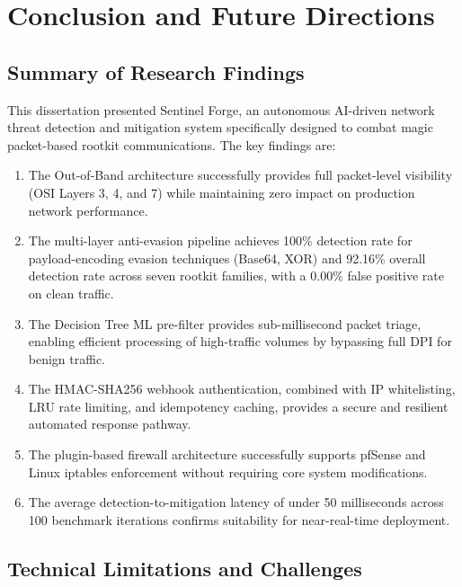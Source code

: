 \chapter{Conclusion and Future Directions}

\section{Summary of Research Findings}

This dissertation presented Sentinel Forge, an autonomous AI-driven network threat detection and mitigation system specifically designed to combat magic packet-based rootkit communications. The key findings are:

\begin{enumerate}
    \item The Out-of-Band architecture successfully provides full packet-level visibility (OSI Layers 3, 4, and 7) while maintaining zero impact on production network performance.
    
    \item The multi-layer anti-evasion pipeline achieves 100\% detection rate for payload-encoding evasion techniques (Base64, XOR) and 92.16\% overall detection rate across seven rootkit families, with a 0.00\% false positive rate on clean traffic.
    
    \item The Decision Tree ML pre-filter provides sub-millisecond packet triage, enabling efficient processing of high-traffic volumes by bypassing full DPI for benign traffic.
    
    \item The HMAC-SHA256 webhook authentication, combined with IP whitelisting, LRU rate limiting, and idempotency caching, provides a secure and resilient automated response pathway.
    
    \item The plugin-based firewall architecture successfully supports pfSense and Linux iptables enforcement without requiring core system modifications.
    
    \item The average detection-to-mitigation latency of under 50 milliseconds across 100 benchmark iterations confirms suitability for near-real-time deployment.
\end{enumerate}

\section{Technical Limitations and Challenges}

